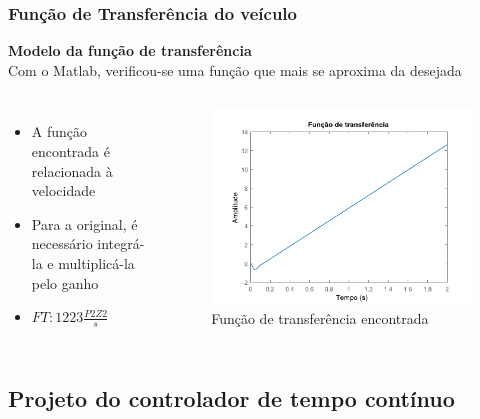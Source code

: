 \begin{frame}
\frametitle{Função de Transferência do veículo}
\textbf{Modelo da função de transferência}\\
Com o Matlab, verificou-se uma função que mais se aproxima da desejada
	
\begin{columns}

 	\begin{itemize}
 	\item A função encontrada é relacionada à velocidade
 	\item Para a original, é necessário integrá-la e multiplicá-la pelo ganho
 	\item $FT: 1223\frac{P2Z2}{s}$
	\end{itemize} 		

 	\vspace{-0.5cm}
	\begin{figure}[th]
	\centering
	\captionsetup{width=0.85\textwidth,font=footnotesize,textfont=bf}
	\includegraphics[width=\linewidth,keepaspectratio]{Figuras/planta2v2.pdf}
	\caption{Função de transferência encontrada}				
	\end{figure}
	
\end{columns}
\end{frame}

\subsection{Projeto do controlador de tempo contínuo}















